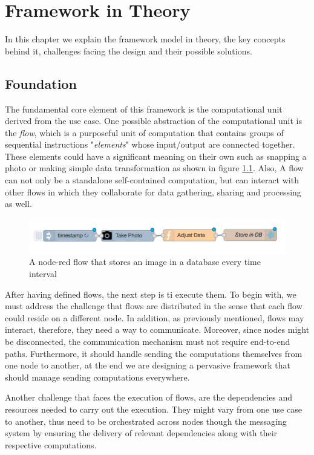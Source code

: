
\chapter{Framework in Theory}\label{chapter:Foundation}
In this chapter we explain the framework model in theory, the key concepts behind it, challenges facing the design and their possible solutions.


\section{Foundation}
	The fundamental core element of this framework is the computational unit derived from the use case. One possible abstraction of the computational unit is the \textit{flow}, which is a purposeful unit of computation that contains groups of sequential instructions "\textit{elements}" whose input/output are connected together. These elements could have a significant meaning on their own such as snapping a photo or making simple data transformation as shown in figure \ref{fig:flow}. Also, A flow can not only be a standalone self-contained computation, but can interact with other flows in which they collaborate for data gathering, sharing and processing as well.
	
	
\begin{figure}[H]
	\centering
	\includegraphics[scale=0.5]{images/db-out.png} 
	\caption{A node-red flow that stores an image in a database every time interval}
	\label{fig:flow}
\end{figure}

After having defined flows, the next step is ti execute them. To begin with, we must address the challenge that flows are distributed in the sense that each flow could reside on a different node. In addition, as previously mentioned, flows may interact, therefore, they need a way to communicate. Moreover, since nodes might be disconnected,  the communication mechanism must not require end-to-end paths. Furthermore, it  should handle sending the computations themselves from one node to another, at the end we are designing a pervasive framework that should manage sending computations everywhere.

 Another challenge that faces the execution of  flows, are the dependencies and resources needed to carry out the execution.
 They might vary from one use case to another, thus need to be orchestrated across nodes though the messaging system by  ensuring the delivery of relevant dependencies along with their respective computations.
 
